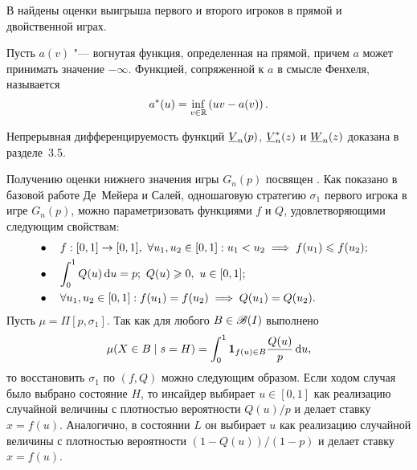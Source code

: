 В  найдены оценки выигрыша первого и второго игроков в прямой и двойственной играх.

Пусть $a(v)$ "--- вогнутая функция, определенная на прямой, причем $a$ может принимать значение $-\infty$.
Функцией, сопряженной к $a$ в смысле Фенхеля, называется
\begin{equation*}
  a^*(u) = \inf_{v \in \mathbb{R}} \left( u v - a(v) \right).
\end{equation*}

Непрерывная дифференцируемость функций $\LV{n}(p)$, $\LV[*]{n}(z)$ и $\LW{n}(z)$ доказана в разделе~3.5.

Получению оценки нижнего значения игры $G_n(p)$ посвящен .
Как показано в базовой работе Де~Мейера и Салей, одношаговую стратегию $\sigma_1$ первого игрока в игре $G_n(p)$, можно параметризовать функциями $f$ и $Q$, удовлетворяющими следующим свойствам:
\begin{subequations}
  \begin{flalign}
    \label{ch3:eq:parametr-prop:f-incr}
    &\bullet\quad f: [0, 1] \rightarrow [0, 1],\ \forall u_1, u_2 \in [0, 1]: u_1 < u_2 \implies f(u_1) \leqslant f(u_2); &\\
    \label{ch3:eq:parametr-prop:int-q=p}
    &\bullet\quad \int_0^1 Q(u) \mathop{}\!\mathrm{d} u = p;\ Q(u) \geqslant 0,\ u \in [0, 1];&\\
    \label{ch3:eq:parametr-prop:f-Q-eq}
    &\bullet\quad \forall u_1, u_2 \in [0, 1]: f(u_1) = f(u_2) \implies Q(u_1) = Q(u_2).&
  \end{flalign}
\end{subequations}
Пусть $\mu = \Pi[p, \sigma_1]$.
Так как для любого $B \in \mathscr{B}(I)$ выполнено
\begin{equation*}
  \mu(X \in B \; | \; s = H) = \int_0^1 \mathbf{1}_{f(u) \in B} \frac{Q(u)}{p} \mathop{}\!\mathrm{d} u,
\end{equation*}
то восстановить $\sigma_1$ по $(f, Q)$ можно следующим образом.
Если ходом случая было выбрано состояние $H$, то инсайдер выбирает $u \in [0, 1]$ как реализацию случайной величины с плотностью вероятности $Q(u)/p$ и делает ставку $x = f(u)$.
Аналогично, в состоянии $L$ он выбирает $u$ как реализацию случайной величины с плотностью вероятности $(1 - Q(u))/(1 - p)$ и делает ставку $x = f(u)$.

